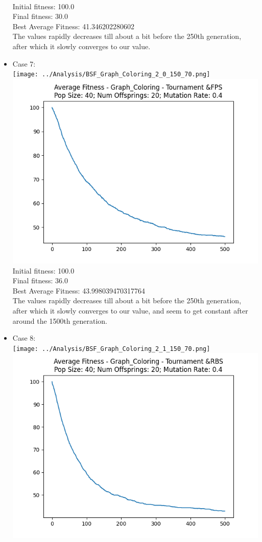 \documentclass[12pt]{report} %
\begin{document}
\begin{itemize}
	      \\Initial fitness:  100.0
	      \\Final fitness:  30.0
	      \\Best Average Fitness: 41.346202280602
	      \\The values rapidly decreases till about a bit before the 250th generation, after which it slowly converges to our value.
	\item Case 7:\\
	      \texttt{[image: ../Analysis/BSF\_Graph\_Coloring\_2\_0\_150\_70.png]}
	      \includegraphics[scale=0.5]{../Analysis/ASF_Graph_Coloring_2_0_40_20.png}
	      \\Initial fitness:  100.0
	      \\Final fitness:  36.0
	      \\Best Average Fitness: 43.998039470317764
	      \\The values rapidly decreases till about a bit before the 250th generation, after which it slowly converges to our value, and seem to get constant after around the 1500th generation.
	\item Case 8:\\
	      \texttt{[image: ../Analysis/BSF\_Graph\_Coloring\_2\_1\_150\_70.png]}
	      \includegraphics[scale=0.5]{../Analysis/ASF_Graph_Coloring_2_1_40_20.png}

\end{itemize}
\end{document}
